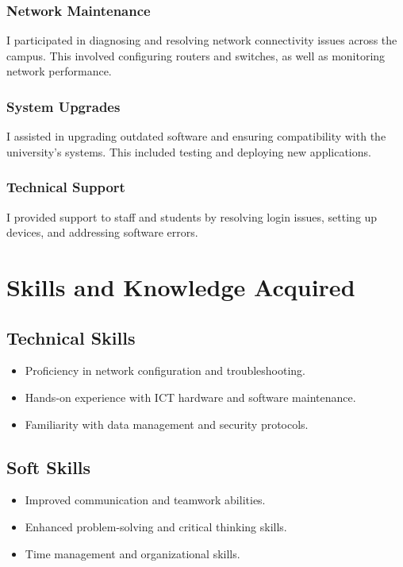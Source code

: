 \documentclass[a4paper,12pt]{report}
\begin{document}
\subsection{Network Maintenance}
I participated in diagnosing and resolving network connectivity issues across the campus. This involved configuring routers and switches, as well as monitoring network performance.

\subsection{System Upgrades}
I assisted in upgrading outdated software and ensuring compatibility with the university’s systems. This included testing and deploying new applications.

\subsection{Technical Support}
I provided support to staff and students by resolving login issues, setting up devices, and addressing software errors.

\chapter{Skills and Knowledge Acquired}
\section{Technical Skills}
\begin{itemize}
\item Proficiency in network configuration and troubleshooting.
\item Hands-on experience with ICT hardware and software maintenance.
\item Familiarity with data management and security protocols.
\end{itemize}

\section{Soft Skills}
\begin{itemize}
\item Improved communication and teamwork abilities.
\item Enhanced problem-solving and critical thinking skills.
\item Time management and organizational skills.
\end{itemize}
\end{document}
